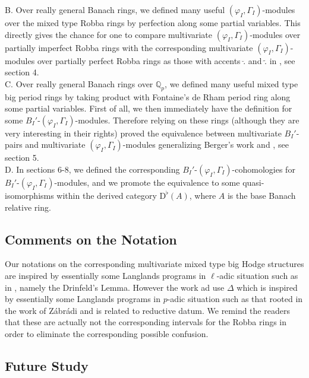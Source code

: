 \documentclass[12pt]{amsart}
\theoremstyle{definition}
\numberwithin{equation}{section}
\begin{document}
\noindent B. Over really general Banach rings, we defined many useful  $(\varphi_I,\Gamma_I)$-modules over the mixed type Robba rings by perfection along some partial variables. This directly gives the chance for one to compare multivariate $(\varphi_I,\Gamma_I)$-modules over partially imperfect Robba rings with the corresponding multivariate $(\varphi_I,\Gamma_I)$-modules over partially perfect Robba rings as those with accents $\breve{.}$ and $\widetilde{.}$ in \cite{KL2}, see section 4.\\

\noindent C. Over really general Banach rings over $\mathbb{Q}_p$, we defined many useful mixed type big period rings by taking product with Fontaine's de Rham period ring along some partial variables. First of all, we then immediately have the definition for some $B_I'$-$(\varphi_I,\Gamma_I)$-modules. Therefore relying on these rings (although they are very interesting in their rights) proved the equivalence between multivariate $B_I'$-pairs and multivariate $(\varphi_I,\Gamma_I)$-modules generalizing Berger's work and \cite{KP}, see section 5.\\


\noindent D. In sections 6-8, we defined the corresponding $B_I'$-$(\varphi_I,\Gamma_I)$-cohomologies for $B_I'$-$(\varphi_I,\Gamma_I)$-modules, and we promote the equivalence to some quasi-isomorphisms within the derived category $\mathrm{D}^\flat(A)$, where $A$ is the base Banach relative ring. \\


\subsection{Comments on the Notation}

Our notations on the corresponding multivariate mixed type big Hodge structures are inspired by essentially some Langlands programs in $\ell$-adic situation such as in \cite{VL}, namely the Drinfeld's Lemma. However the work \cite{PZ} ad \cite{CKZ} use $\Delta$ which is inspired by essentially some Langlands programs in $p$-adic situation such as that rooted in the work of Z\'abr\'adi and is related to reductive datum. We remind the readers that these are actually not the corresponding intervals for the Robba rings in order to eliminate the corresponding possible confusion. \\




\subsection{Future Study}
\end{document}
